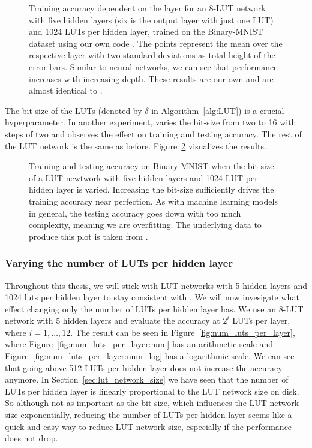 \begin{figure}[!htb]
    \centering
    
    \caption{Training accuracy dependent on the layer for an 8-LUT network with five hidden layers (six is the output layer with just one LUT) and 1024 LUTs per hidden layer, trained on the Binary-MNIST dataset using our own code \cite{bib:lut_github}. The points represent the mean over the respective layer with two standard deviations as total height of the error bars. Similar to neural networks, we can see that performance increases with increasing depth. These results are our own and are almost identical to \cite{bib:chatterjee2018learning}.}
\label{fig:ex1_depth_performance}
\end{figure}
\FloatBarrier

\noindent The bit-size of the LUTs (denoted by $\delta$ in Algorithm~\ref{alg:LUT}) is a crucial hyperparameter. In another experiment, \cite{bib:chatterjee2018learning} varies the bit-size from two to 16 with steps of two and observes the effect on training and testing accuracy. The rest of the LUT network is the same as before. Figure~\ref{fig:ex1_k_acc} visualizes the results.

\begin{figure}[!htb]
    \centering
    
    \caption{Training and testing accuracy on Binary-MNIST when the bit-size of a LUT newtwork with five hidden layers and 1024 LUT per hidden layer is varied. Increasing the bit-size sufficiently drives the training accuracy near perfection. As with machine learning models in general, the testing accuracy goes down with too much complexity, meaning we are overfitting. The underlying data to produce this plot is taken from \cite{bib:chatterjee2018learning}.}
\label{fig:ex1_k_acc}
\end{figure}
\FloatBarrier

\subsubsection{Varying the number of LUTs per hidden layer} \label{sec:num_luts_per_layer}
Throughout this thesis, we will stick with LUT networks with 5 hidden layers and 1024 luts per hidden layer to stay consistent with \cite{bib:chatterjee2018learning}. We will now invesigate what effect changing only the number of LUTs per hidden layer has. We use an 8-LUT network with 5 hidden layers and evaluate the accuracy at $2^i$ LUTs per layer, where $i = 1, \dots, 12$. The result can be seen in Figure~\ref{fig:num_luts_per_layer}, where Figure~\ref{fig:num_luts_per_layer:num} has an arithmetic scale and Figure~\ref{fig:num_luts_per_layer:num_log} has a logarithmic scale. We can see that going above 512 LUTs per hidden layer does not increase the accuracy anymore. In Section~\ref{sec:lut_network_size} we have seen that the number of LUTs per hidden layer is linearly proportional to the LUT network size on disk. So although not as important as the bit-size, which influences the LUT network size exponentially, reducing the number of LUTs per hidden layer seems like a quick and easy way to reduce LUT network size, especially if the performance does not drop.

